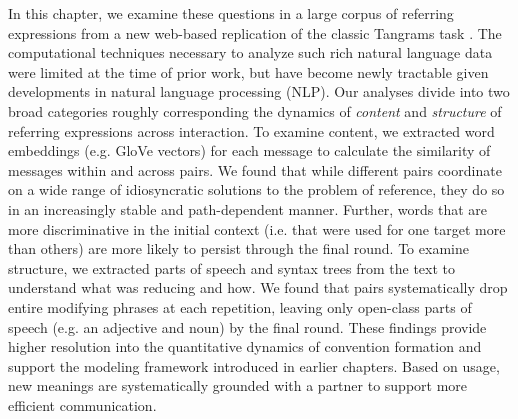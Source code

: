 
In this chapter, we examine these questions in a large corpus of referring expressions from a new web-based replication of the classic Tangrams task \cite{ClarkWilkesGibbs86_ReferringCollaborative}.
The computational techniques necessary to analyze such rich natural language data were limited at the time of prior work, but have become newly tractable given developments in natural language processing (NLP). 
Our analyses divide into two broad categories roughly corresponding the dynamics of \emph{content} and \emph{structure} of referring expressions across interaction.
To examine content, we extracted word embeddings (e.g. GloVe vectors) for each message to calculate the similarity of messages within and across pairs. 
We found that while different pairs coordinate on a wide range of idiosyncratic solutions to the problem of reference, they do so in an increasingly stable and path-dependent manner. 
Further, words that are more discriminative in the initial context (i.e. that were used for one target more than others) are more likely to persist through the final round. 
To examine structure, we extracted parts of speech and syntax trees from the text to understand what was reducing and how.
We found that pairs systematically drop entire modifying phrases at each repetition, leaving only open-class parts of speech (e.g. an adjective and noun) by the final round. 
These findings provide higher resolution into the quantitative dynamics of convention formation and support the modeling framework introduced in earlier chapters. 
Based on usage, new meanings are systematically grounded with a partner to support more efficient communication.


